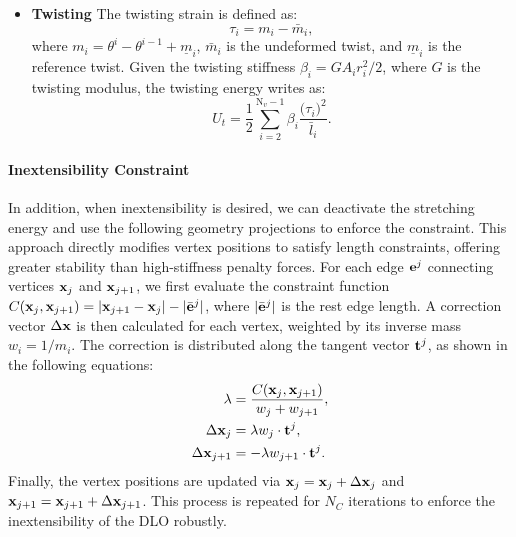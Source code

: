 \begin{itemize}[leftmargin=10pt]
\begin{equation}
\begin{pmatrix}
            r_i^2 & 0 \\
            0 & r_i^2
        \end{pmatrix},
    \end{equation}
    is the bending stiffness, $E$ is the bending modulus.
    \item \textbf{Twisting} The twisting strain is defined as:
    \begin{equation}
        \tau_i = m_i-\bar{m}_i,
    \end{equation}
    where $m_i=\theta^i-\theta^{i-1}+\underline{m}_i$, $\bar{m}_i$ is the undeformed twist, and $\underline{m}_i$ is the reference twist. Given the twisting stiffness $\beta_i=GA_i r_i^2/2$, where $G$ is the twisting modulus, the twisting energy writes as:
    \begin{equation}
        U_t=\frac{1}{2}\sum_{i=2}^{\text{N}_v-1}\beta_i\frac{\big(\tau_i\big)^2}{\bar{l}_i}.
    \end{equation}
\end{itemize}

\paragraph{Inextensibility Constraint} In addition, when inextensibility is desired, we can deactivate the stretching energy and use the following geometry projections to enforce the constraint. This approach directly modifies vertex positions to satisfy length constraints, offering greater stability than high-stiffness penalty forces. For each edge ${\mathbf{e}}^j$ connecting vertices ${\mathbf{x}}_j$ and ${\mathbf{x}}_{j+1}$, we first evaluate the constraint function $C({\mathbf{x}}_j, {\mathbf{x}}_{j+1}) = |{\mathbf{x}}_{j+1} - {\mathbf{x}}_j| - |\bar{{\mathbf{e}}}^j|$, where $|\bar{{\mathbf{e}}}^j|$ is the rest edge length. A correction vector $\Delta {\mathbf{x}}$ is then calculated for each vertex, weighted by its inverse mass $w_i = 1/m_i$. The correction is distributed along the tangent vector ${\mathbf{t}}^j$, as shown in the following equations: 
\begin{equation}
\begin{split}
    \lambda &= \frac{C({\mathbf{x}}_j, {\mathbf{x}}_{j+1})}{w_j + w_{j+1}},\\
    \Delta {\mathbf{x}}_j &= \lambda w_j \cdot {\mathbf{t}}^j,\\
    \Delta {\mathbf{x}}_{j+1} &= -\lambda w_{j+1} \cdot {\mathbf{t}}^j.
\end{split}
\end{equation}
 Finally, the vertex positions are updated via ${\mathbf{x}}_j = {\mathbf{x}}_j + \Delta {\mathbf{x}}_j$ and ${\mathbf{x}}_{j+1} = {\mathbf{x}}_{j+1} + \Delta {\mathbf{x}}_{j+1}$. This process is repeated for $N_C$ iterations to enforce the inextensibility of the DLO robustly.

